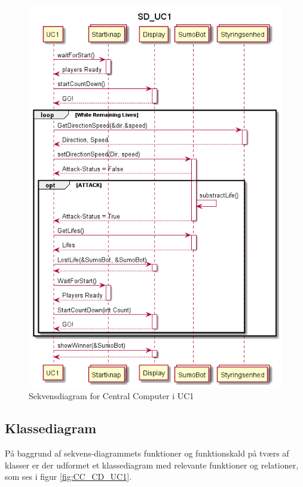\begin{figure}
    \centering
    \includegraphics[width=\textwidth]{figs/Design/Central Computer/SekvensDiagrammer/SD_UC1.png}
    \caption{Sekvensdiagram for Central Computer i UC1}
    \label{fig:CC_SD_UC1}
\end{figure}

\subsection{Klassediagram}
På baggrund af sekvens-diagrammets funktioner og funktionskald på tværs af klasser er der udformet et klassediagram med relevante funktioner og relationer, som ses i figur \ref{fig:CC_CD_UC1}. 


